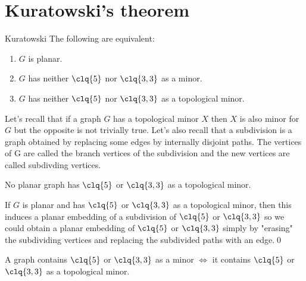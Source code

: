 \section{Kuratowski's theorem}
\begin{customtheorem}{Kuratowski}
\label{theorem:kuratowski}
    The following are equivalent:
    \begin{enumerate}
        \item $G$ is planar.
        \item $G$ has neither $\clq{5}$ nor $\clq{3, 3}$ as a minor.
        \item $G$ has neither $\clq{5}$ nor $\clq{3, 3}$ as a topological minor.
    \end{enumerate}
\end{customtheorem}
Let's recall that if a graph $G$ has a topological minor $X$ then $X$ is also minor for $G$ but the opposite is not trivially true. Let's also recall that a subdivision is a graph obtained by replacing some edges by internally disjoint paths. The vertices of G are called the branch vertices of the subdivision and the new vertices are called subdivding vertices.
\begin{customlemma}{4.14}
\label{lemma:4.14}
    No planar graph has $\clq{5}$ or $\clq{3, 3}$ as a topological minor.
\end{customlemma}
\begin{prf}
    If $G$ is planar and has $\clq{5}$ or $\clq{3, 3}$ as a topological minor, then this induces a planar embedding of a subdivision of $\clq{5}$ or $\clq{3, 3}$ so we could obtain a planar embedding of $\clq{5}$ or $\clq{3, 3}$ simply by "erasing" the subdividing vertices and replacing the subdivided paths with an edge.\qed
\end{prf}
\begin{customlemma}{4.15}
\label{lemma:4.15}
    A graph contains $\clq{5}$ or $\clq{3, 3}$ as a minor $\iff$ it contains $\clq{5}$ or $\clq{3, 3}$ as a topological minor.
\end{customlemma}
